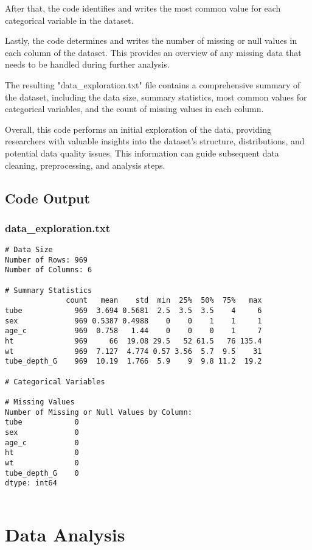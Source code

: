 \documentclass[11pt]{article}
\begin{document}
After that, the code identifies and writes the most common value for each categorical variable in the dataset. 

Lastly, the code determines and writes the number of missing or null values in each column of the dataset. This provides an overview of any missing data that needs to be handled during further analysis. 

The resulting "data\_exploration.txt" file contains a comprehensive summary of the dataset, including the data size, summary statistics, most common values for categorical variables, and the count of missing values in each column.

Overall, this code performs an initial exploration of the data, providing researchers with valuable insights into the dataset's structure, distributions, and potential data quality issues. This information can guide subsequent data cleaning, preprocessing, and analysis steps.

\subsection{Code Output}

\subsubsection*{data\_exploration.txt}

\begin{Verbatim}[tabsize=4]
# Data Size
Number of Rows: 969
Number of Columns: 6

# Summary Statistics
              count   mean    std  min  25%  50%  75%   max
tube            969  3.694 0.5681  2.5  3.5  3.5    4     6
sex             969 0.5387 0.4988    0    0    1    1     1
age_c           969  0.758   1.44    0    0    0    1     7
ht              969     66  19.08 29.5   52 61.5   76 135.4
wt              969  7.127  4.774 0.57 3.56  5.7  9.5    31
tube_depth_G    969  10.19  1.766  5.9    9  9.8 11.2  19.2

# Categorical Variables

# Missing Values
Number of Missing or Null Values by Column:
tube            0
sex             0
age_c           0
ht              0
wt              0
tube_depth_G    0
dtype: int64


\end{Verbatim}

\section{Data Analysis}
\end{document}
